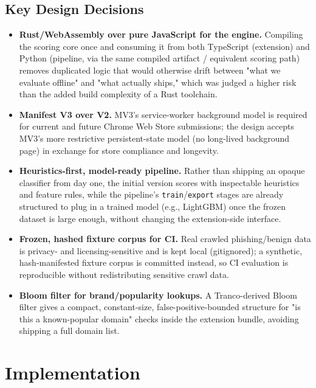 \documentclass[conference]{IEEEtran}
\begin{document}
\subsection{Key Design Decisions}
\begin{itemize}
  \item \textbf{Rust/WebAssembly over pure JavaScript for the engine.} Compiling the scoring core once and consuming it from both TypeScript (extension) and Python (pipeline, via the same compiled artifact / equivalent scoring path) removes duplicated logic that would otherwise drift between "what we evaluate offline" and "what actually ships," which was judged a higher risk than the added build complexity of a Rust toolchain.
  \item \textbf{Manifest V3 over V2.} MV3's service-worker background model is required for current and future Chrome Web Store submissions; the design accepts MV3's more restrictive persistent-state model (no long-lived background page) in exchange for store compliance and longevity.
  \item \textbf{Heuristics-first, model-ready pipeline.} Rather than shipping an opaque classifier from day one, the initial version scores with inspectable heuristics and feature rules, while the pipeline's \texttt{train}/\texttt{export} stages are already structured to plug in a trained model (e.g., LightGBM) once the frozen dataset is large enough, without changing the extension-side interface.
  \item \textbf{Frozen, hashed fixture corpus for CI.} Real crawled phishing/benign data is privacy- and licensing-sensitive and is kept local (gitignored); a synthetic, hash-manifested fixture corpus is committed instead, so CI evaluation is reproducible without redistributing sensitive crawl data.
  \item \textbf{Bloom filter for brand/popularity lookups.} A Tranco-derived Bloom filter gives a compact, constant-size, false-positive-bounded structure for "is this a known-popular domain" checks inside the extension bundle, avoiding shipping a full domain list.
\end{itemize}

\section{Implementation}
\end{document}
